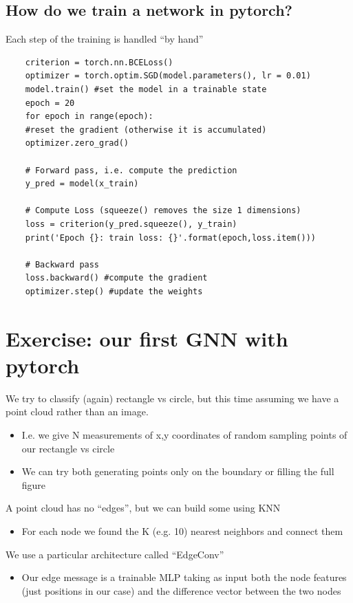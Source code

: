 \subsection{How do we train a network in pytorch?}
Each step of the training is handled “by hand”

\begin{verbatim}
	criterion = torch.nn.BCELoss()
	optimizer = torch.optim.SGD(model.parameters(), lr = 0.01)
	model.train() #set the model in a trainable state
	epoch = 20
	for epoch in range(epoch):
	#reset the gradient (otherwise it is accumulated)
	optimizer.zero_grad()
	
	# Forward pass, i.e. compute the prediction
	y_pred = model(x_train)
	
	# Compute Loss (squeeze() removes the size 1 dimensions)
	loss = criterion(y_pred.squeeze(), y_train)
	print('Epoch {}: train loss: {}'.format(epoch,loss.item()))
	
	# Backward pass
	loss.backward() #compute the gradient
	optimizer.step() #update the weights
\end{verbatim}

\section{Exercise: our first GNN with pytorch}

We try to classify (again) rectangle vs
circle, but this time assuming we have a point cloud rather than an image.

\begin{itemize}
	\item I.e. we give N measurements of x,y
	coordinates of random sampling points of
	our rectangle vs circle
	\item We can try both generating points only on
	the boundary or filling the full figure
\end{itemize}

A point cloud has no “edges”, but we
can build some using KNN
\begin{itemize}
	\item For each node we found the K (e.g. 10)
	nearest neighbors and connect them
\end{itemize}

We use a particular architecture called
“EdgeConv”
\begin{itemize}
	\item Our edge message is a trainable MLP
	taking as input both the node features (just
	positions in our case) and the difference
	vector between the two nodes
\end{itemize}

